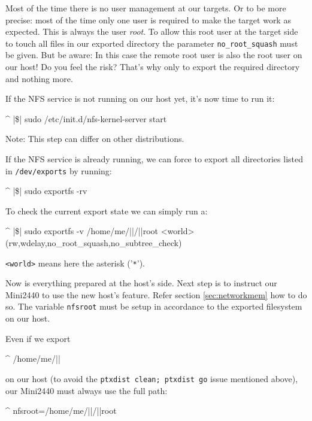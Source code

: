 Most of the time there is no user management at our targets. Or to be more precise: most of
the time only one user is required to make the target work as expected. This is always the
user \textit{root}. To allow this root user at the target side to touch all files in our exported
directory the parameter \texttt{no\_root\_squash} must be given. But be aware: In this
case the remote root user is also the root user on our host! Do you feel the risk? That's why
only to export the required directory and nothing more.

If the NFS service is not running on our host yet, it's now time to run it:

\begin{ptxshell}[escapechar=|]{^}
|\$| sudo /etc/init.d/nfs-kernel-server start
\end{ptxshell}

Note: This step can differ on other distributions.

If the NFS service is already running, we can force to export all directories listed in
\texttt{/dev/exports} by running:

\begin{ptxshell}[escapechar=|]{^}
|\$| sudo exportfs -rv
\end{ptxshell}

To check the current export state we can simply run a:

\begin{ptxshell}[escapechar=|]{^}
|\$| sudo exportfs -v
/home/me/|\ptxdistBSPName |/|\ptxdistPlatformDir |root
	<world>(rw,wdelay,no_root_squash,no_subtree_check)
\end{ptxshell}

\texttt{<world>} means here the asterisk ('\texttt{*}').

Now is everything prepared at the host's side. Next step is to instruct our
Mini2440 to use the new host's feature. Refer section \ref{sec:networkmem} how
to do so. The variable \texttt{nfsroot} must be setup in accordance to the
exported filesystem on our host.

Even if we export

\begin{ptxshell}[escapechar=|]{^}
/home/me/|\ptxdistBSPName |
\end{ptxshell}

on our host (to avoid the \texttt{ptxdist clean; ptxdist go} issue mentioned above),
our Mini2440 must always use the full path:

\begin{ptxshell}[escapechar=|]{^}
nfsroot=/home/me/|\ptxdistBSPName |/|\ptxdistPlatformDir |root
\end{ptxshell}

